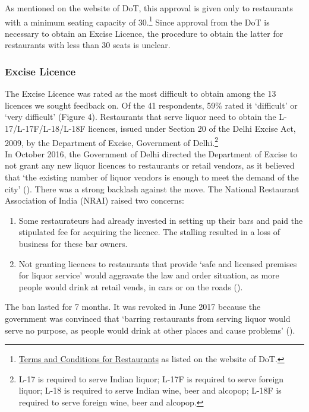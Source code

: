 \documentclass[a4paper, 12pt]{article}
\begin{document}
		As mentioned on the website of DoT, this approval is given only to restaurants with a minimum seating capacity of 30.\footnote{\href{https://bit.ly/2NMdccI}{Terms and Conditions for Restaurants} as listed on the website of DoT.}  Since approval from the 
DoT is necessary to obtain an Excise Licence, the procedure to obtain the latter for restaurants with less than 30 seats is unclear. %
		
		
		\subsubsection{Excise Licence}
		The Excise Licence was rated as the most difficult to obtain among the 13 licences we sought feedback on. Of the 41 respondents, 59\% rated it ‘difficult’ or ‘very difficult’ (Figure 4). Restaurants that serve liquor need to obtain the L-17/L-17F/L-18/L-18F 
licences, issued under Section 20 of the Delhi Excise Act, 2009, by the Department of Excise, Government of Delhi.\footnote{L-17 is required to serve Indian liquor; L-17F is required to serve foreign liquor; L-18 is required to serve Indian wine, beer and alcopop; 
L-18F is required to serve foreign wine, beer and alcopop.} \\ %
		
		In October 2016, the Government of Delhi directed the Department of Excise to not grant any new liquor licences to restaurants or retail vendors, as it believed that ‘the existing number of liquor vendors is enough to meet the demand of the city’ (\cite{toi2016nonewliqlicense}). There was a strong backlash against the move. The National Restaurant Association of India (NRAI) raised two concerns:
		\begin {enumerate}
			\item Some restaurateurs had already invested in setting up their bars and paid the stipulated fee for acquiring the licence. The stalling resulted in a loss of business for these bar owners.
			\item Not granting licences to restaurants that provide ‘safe and licensed premises for liquor service’ would aggravate the law and order situation, as more people would drink at retail vends, in cars or on the roads (\cite{toi2016nonewliqlicense}).
		\end {enumerate}
		
		The ban lasted for 7 months. It was revoked in June 2017 because the government was convinced that ‘barring restaurants from serving liquor would serve no purpose, as people would drink at other places and cause problems’ (\cite{ie2017delliqlicensebanlifted}). \\
		
\end{document}
